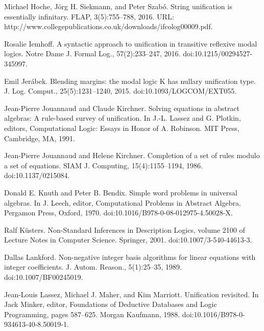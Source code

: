 \par\noindent  [33]  Michael Hoche, Jörg H. Siekmann, and Peter Szabó.  String unification is essentially infinitary.  FLAP, 3(5):755–788, 2016.  URL: http://www.collegepublications.co.uk/downloads/ifcolog00009.pdf.  
 
\par\noindent  [34]  Rosalie Iemhoff.  A syntactic approach to unification in transitive reflexive modal logics.  Notre Dame J. Formal Log., 57(2):233–247, 2016.  doi:10.1215/00294527-345997.  
 
\par\noindent  [35]  Emil Jerábek.  Blending margins: the modal logic K has nullary unification type.  J. Log. Comput., 25(5):1231–1240, 2015.  doi:10.1093/LOGCOM/EXT055.  
 
\par\noindent  [36]  Jean-Pierre Jouannaud and Claude Kirchner.  Solving equations in abstract algebras: A rule-based survey of unification.  In J.-L. Lassez and G. Plotkin, editors, Computational Logic: Essays in Honor of A. Robinson. MIT Press, Cambridge, MA, 1991.  
 
\par\noindent  [37]  Jean-Pierre Jouannaud and Helene Kirchner.  Completion of a set of rules modulo a set of equations.  SIAM J. Computing, 15(4):1155–1194, 1986.  doi:10.1137/0215084.  
 
\par\noindent  [38]  Donald E. Knuth and Peter B. Bendix.  Simple word problems in universal algebras.  In J. Leech, editor, Computational Problems in Abstract Algebra. Pergamon Press, Oxford, 1970.  doi:10.1016/B978-0-08-012975-4.50028-X.  
 
\par\noindent  [39]  Ralf Küsters.  Non-Standard Inferences in Description Logics, volume 2100 of Lecture Notes in Computer Science.  Springer, 2001.  doi:10.1007/3-540-44613-3.  
 
\par\noindent  [40]  Dallas Lankford.  Non-negative integer basis algorithms for linear equations with integer coefficients.  J. Autom. Reason., 5(1):25–35, 1989.  doi:10.1007/BF00245019.  
 
\par\noindent  [41]  Jean-Louis Lassez, Michael J. Maher, and Kim Marriott.  Unification revisited.  In Jack Minker, editor, Foundations of Deductive Databases and Logic Programming, pages 587–625. Morgan Kaufmann, 1988.  doi:10.1016/B978-0-934613-40-8.50019-1.  
 
